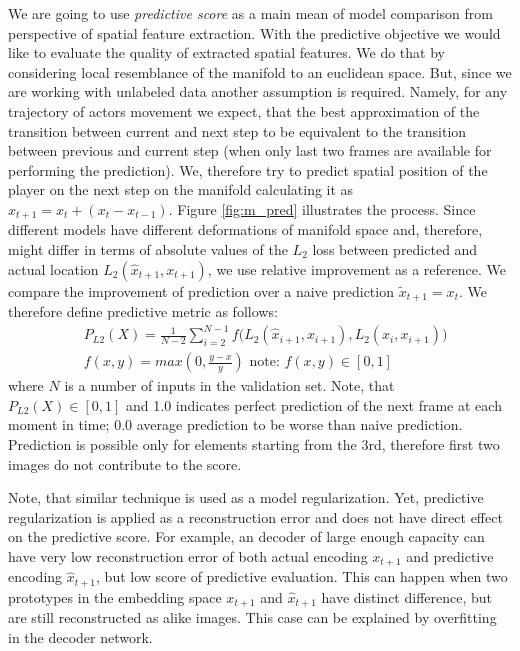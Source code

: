 We are going to use \textit{predictive score} as a main mean of model comparison from perspective of spatial feature extraction. With the predictive objective we would like to evaluate the quality of extracted spatial features. We do that by considering local resemblance of the manifold to an euclidean space. But, since we are working with unlabeled data another assumption is required. Namely, for any trajectory of actors movement we expect, that the best approximation of the transition between current and next step to be equivalent to the transition between previous and current step (when only last two frames are available for performing the prediction). We, therefore try to predict spatial position of the player on the next step on the manifold calculating it as $\hat{x}_{t+1} = x_t + (x_t- x_{t-1})$. Figure \ref{fig:m_pred} illustrates the process.
Since different models have different deformations of manifold space and, therefore, might differ in terms of absolute values of the $L_2$ loss between predicted and actual location $L_2(\hat{x}_{t+1}, x_{t+1})$, we use relative improvement as a reference. We compare the improvement of prediction over a naive prediction $\tilde{x}_{t+1} = x_t$. We therefore define predictive metric as follows:
\begin{equation}
  \begin{aligned}
  &P_{L2}(X) = \frac{1}{N-2}\sum^{N-1}_{i=2}{f(L_2(\hat{x}_{i+1}, x_{i+1})}, {L_2(x_i, x_{i+1}))}\\
  &f(x, y) = max(0, \frac{y-x}{y}) \text{ note: } f(x, y) \in [0, 1]
  \end{aligned}
\end{equation}
where $N$ is a number of inputs in the validation set. Note, that $P_{L2}(X) \in [0, 1]$ and 1.0 indicates perfect prediction of the next frame at each moment in time; 0.0 average prediction to be worse than naive prediction. Prediction is possible only for elements starting from the 3rd, therefore first two images do not contribute to the score.

Note, that similar technique is used as a model regularization. Yet, predictive regularization is applied as a reconstruction error and does not have direct effect on the predictive score. For example, an decoder of large enough capacity can have very low reconstruction error of both actual encoding $x_{t+1}$ and predictive encoding $\hat{x}_{t+1}$, but low score of predictive evaluation. This can happen when two prototypes in the embedding space $x_{t+1}$ and $\hat{x}_{t+1}$ have distinct difference, but are still reconstructed as alike images. This case can be explained by overfitting in the decoder network.

